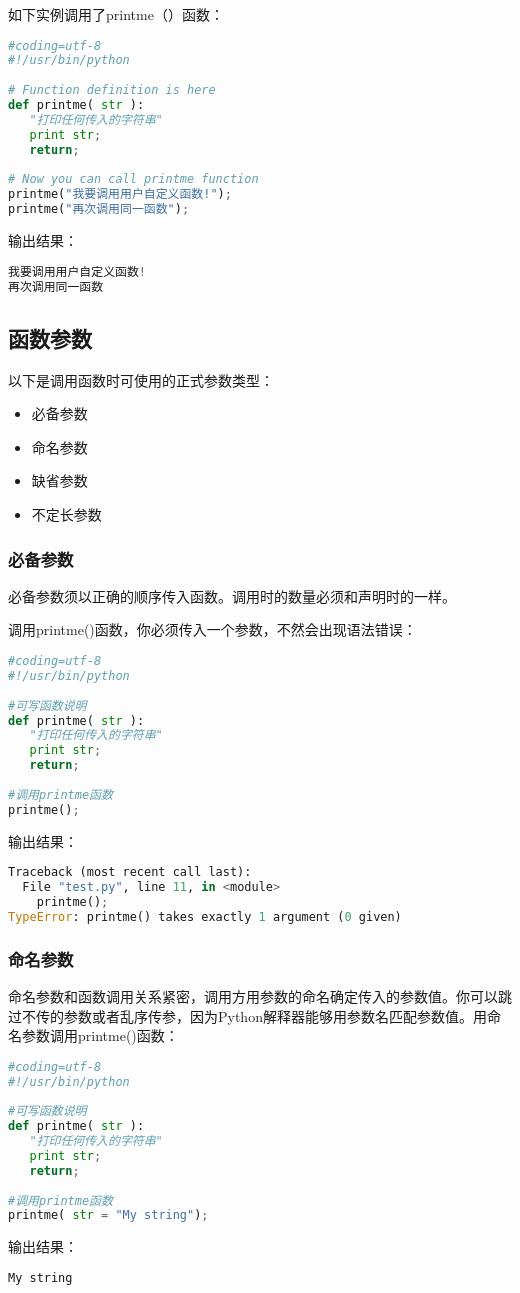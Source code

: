 如下实例调用了printme（）函数：
\begin{lstlisting}[language=Python]
#coding=utf-8
#!/usr/bin/python
 
# Function definition is here
def printme( str ):
   "打印任何传入的字符串"
   print str;
   return;
 
# Now you can call printme function
printme("我要调用用户自定义函数!");
printme("再次调用同一函数");
\end{lstlisting}
输出结果：
\begin{lstlisting}[language=Python]
我要调用用户自定义函数!
再次调用同一函数
\end{lstlisting}


\subsection{函数参数}
以下是调用函数时可使用的正式参数类型：
\begin{itemize}
\item 必备参数
\item 命名参数
\item 缺省参数
\item 不定长参数
\end{itemize}


\subsubsection{必备参数}
必备参数须以正确的顺序传入函数。调用时的数量必须和声明时的一样。

调用printme()函数，你必须传入一个参数，不然会出现语法错误：
\begin{lstlisting}[language=Python]
#coding=utf-8
#!/usr/bin/python
 
#可写函数说明
def printme( str ):
   "打印任何传入的字符串"
   print str;
   return;
 
#调用printme函数
printme();
\end{lstlisting}
输出结果：
\begin{lstlisting}[language=Python]
Traceback (most recent call last):
  File "test.py", line 11, in <module>
    printme();
TypeError: printme() takes exactly 1 argument (0 given)
\end{lstlisting}


\subsubsection{命名参数}
命名参数和函数调用关系紧密，调用方用参数的命名确定传入的参数值。你可以跳过不传的参数或者乱序传参，因为Python解释器能够用参数名匹配参数值。用命名参数调用printme()函数：
\begin{lstlisting}[language=Python]
#coding=utf-8
#!/usr/bin/python
 
#可写函数说明
def printme( str ):
   "打印任何传入的字符串"
   print str;
   return;
 
#调用printme函数
printme( str = "My string");
\end{lstlisting}
输出结果：
\begin{lstlisting}[language=Python]
My string
\end{lstlisting}

